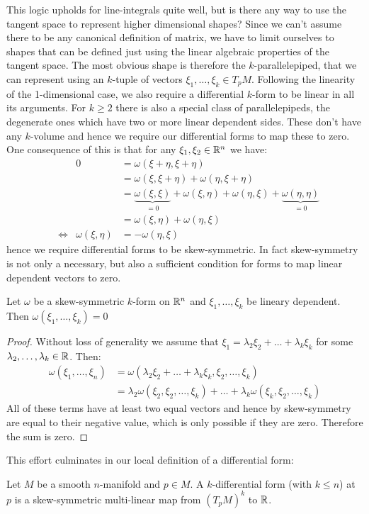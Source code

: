 This logic upholds for line-integrals quite well, but is there any way to use the
tangent space to represent higher dimensional shapes? Since we can't assume there
to be any canonical definition of matrix, we have to limit ourselves to shapes that
can be defined just using the linear algebraic properties of the tangent space. The
most obvious shape is therefore the $k$-parallelepiped, that we can represent using
an $k$-tuple of vectors $\xi_1, \dots, \xi_k \in T_pM$. Following the linearity of 
the 1-dimensional case, we also require a differential $k$-form to be linear in all
its arguments. For $k \geq 2$ there is also a special class of parallelepipeds,
the degenerate ones which have two or more linear dependent sides. These don't have
any $k$-volume and hence we require our differential forms to map these to zero.
One consequence of this is that for any $\xi_1, \xi_2 \in \mathbb{R}^n$ we have:
\begin{align*}
&&	 0 &= \omega(\xi + \eta, \xi + \eta) \\
&&	   &= \omega(\xi, \xi + \eta) + \omega(\eta, \xi + \eta) \\
&&	   &= \underbrace{\omega(\xi, \xi)}_{= 0} + \omega(\xi, \eta) + \omega(\eta, \xi) + \underbrace{\omega(\eta, \eta)}_{= 0} \\
&&	   &= \omega(\xi, \eta) + \omega(\eta, \xi) \\
&\iff& \omega(\xi,\eta) &= - \omega(\eta,\xi)
\end{align*}
hence we require differential forms to be skew-symmetric. In fact skew-symmetry is
not only a necessary, but also a sufficient condition for forms to map linear
dependent vectors to zero.
\begin{lemma}
	Let $\omega$ be a skew-symmetric $k$-form on $\mathbb{R}^n$ and $\xi_1, \dots, \xi_k$
	be lineary dependent. Then $\omega(\xi_1, \dots, \xi_k) = 0$
\end{lemma}
\begin{proof}
	Without loss of generality we assume that $\xi_1 = \lambda_2 \xi_2 + \dots + \lambda_k \xi_k$
	for some $\lambda_2, \dots, \lambda_k \in \mathbb{R}$. Then:
	\begin{align*}
		\omega(\xi_1, \dots, \xi_n)
		&=
		\omega(\lambda_2 \xi_2 + \dots + \lambda_k \xi_k, \xi_2, \dots, \xi_k) \\
		&=
		\lambda_2 \omega(\xi_2, \xi_2, \dots, \xi_k) + \dots + \lambda_k \omega(\xi_k, \xi_2, \dots, \xi_k)
	\end{align*}
	All of these terms have at least two equal vectors and hence by skew-symmetry are equal to their
	negative value, which is only possible if they are zero. Therefore the sum is zero.
\end{proof}
This effort culminates in our local definition of a differential form:
\begin{definition}
Let $M$ be a smooth $n$-manifold and $p \in M$. A $k$-differential form (with $k \leq n$)
at $p$ is a skew-symmetric multi-linear map from $(T_p M)^k$ to $\mathbb{R}$.
\end{definition}

